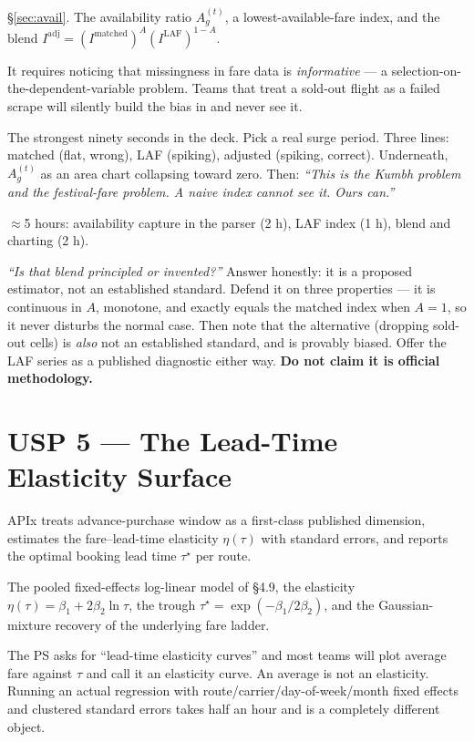  \S\ref{sec:avail}. The availability ratio $A_g^{(t)}$, a
lowest-available-fare index, and the blend
$I^{\text{adj}} = (I^{\text{matched}})^{A}(I^{\text{LAF}})^{1-A}$.

 It requires noticing that missingness in fare data is
\emph{informative} --- a selection-on-the-dependent-variable problem. Teams that treat a
sold-out flight as a failed scrape will silently build the bias in and never see it.

 The strongest ninety seconds in the deck. Pick a real surge period.
Three lines: matched (flat, wrong), LAF (spiking), adjusted (spiking, correct). Underneath,
$A_g^{(t)}$ as an area chart collapsing toward zero. Then: \emph{``This is the Kumbh problem
and the festival-fare problem. A naive index cannot see it. Ours can.''}

 $\approx$5 hours: availability capture in the parser (2 h), LAF index
(1 h), blend and charting (2 h).

 \emph{``Is that blend principled or invented?''} Answer
honestly: it is a proposed estimator, not an established standard. Defend it on three
properties --- it is continuous in $A$, monotone, and exactly equals the matched index when
$A=1$, so it never disturbs the normal case. Then note that the alternative (dropping
sold-out cells) is \emph{also} not an established standard, and is provably biased. Offer
the LAF series as a published diagnostic either way. \textbf{Do not claim it is official
methodology.}

\section{USP 5 --- The Lead-Time Elasticity Surface}

\begin{uspbox}
 APIx treats advance-purchase window as a first-class published dimension,
estimates the fare--lead-time elasticity $\eta(\tau)$ with standard errors, and reports the
optimal booking lead time $\tau^\star$ per route.
\end{uspbox}

 The pooled fixed-effects log-linear model of \S4.9, the elasticity
$\eta(\tau)=\beta_1+2\beta_2\ln\tau$, the trough
$\tau^\star=\exp(-\beta_1/2\beta_2)$, and the Gaussian-mixture recovery of the underlying
fare ladder.

 The PS asks for ``lead-time elasticity curves'' and most
teams will plot average fare against $\tau$ and call it an elasticity curve. An average is
not an elasticity. Running an actual regression with route/carrier/day-of-week/month fixed
effects and clustered standard errors takes half an hour and is a completely different
object.

